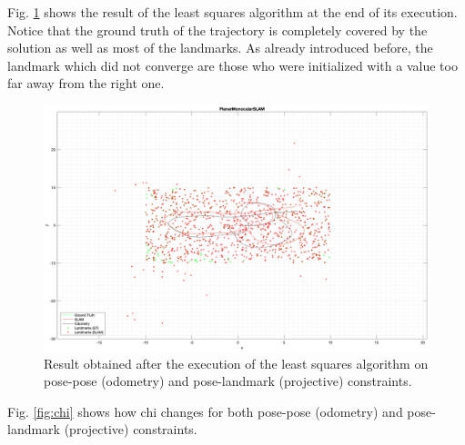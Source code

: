 \documentclass[11pt]{extarticle}
\begin{document}
Fig. \ref{fig:slam-ls} shows the result of the least squares algorithm at
the end of its execution. Notice that the ground truth of the trajectory is
completely covered by the solution as well as most of the landmarks. As
already introduced before, the landmark which did not converge are those who
were initialized with a value too far away from the right one.
\begin{figure}
    \centering
    \includegraphics[width=\textwidth]{images/slam-ls.png}
    \caption{Result obtained after the execution of the least squares
        algorithm on pose-pose (odometry) and pose-landmark (projective)
        constraints.}
    \label{fig:slam-ls}
\end{figure}

Fig. \ref{fig:chi} shows how chi changes for both pose-pose (odometry) and
pose-landmark (projective) constraints.
\end{document}
